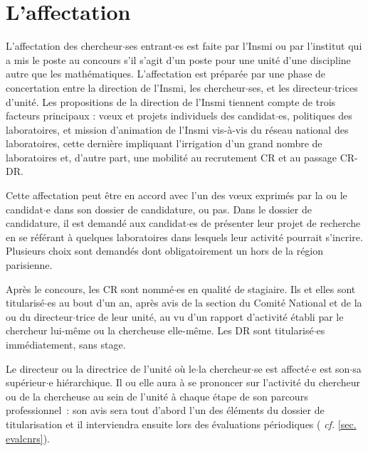 \section{L'affectation}


L'affectation des chercheur$\cdot$ses entrant$\cdot$es est faite par l'Insmi ou par l'institut qui a mis le poste au concours s'il s'agit d'un poste pour une unit\'e d'une discipline autre que les math\'ematiques. 
L'affectation est pr\' epar\' ee par une phase de concertation entre la direction de l'Insmi, les chercheur$\cdot$ses, et les directeur$\cdot$trices d'unit\' e. Les propositions de la direction de l'Insmi tiennent compte de trois facteurs principaux : v\oe ux et projets individuels des candidat$\cdot$es, politiques des laboratoires, et mission d'animation de l'Insmi vis-\`a-vis du r\' eseau national des laboratoires, cette derni\` ere impliquant l'irrigation d'un grand nombre de laboratoires et, d'autre part, une mobilit\' e au recrutement CR et au passage CR-DR.


Cette affectation peut \^etre en accord avec l'un des v\oe ux exprim\' es par la ou le candidat$\cdot$e
dans son dossier de candidature, ou pas. Dans le dossier de candidature, il est demand\'e aux candidat$\cdot$es de pr\'esenter
leur projet de recherche en se r\'ef\'erant \`a quelques laboratoires dans lesquels leur activit\'e pourrait s'incrire. Plusieurs choix sont demand\'es dont obligatoirement un hors de la r\'egion parisienne.

Apr\`es le concours, les CR sont nomm\'e$\cdot$es en qualit\'e de stagiaire.  Ils et elles sont
titularis\'e$\cdot$es au bout d'un an,  apr\`es avis de la section du Comit\'e National et de la ou du
directeur$\cdot$trice de leur unit\'e, au vu d'un rapport d'activit\'e
\'etabli par le chercheur lui-m\^eme ou la chercheuse elle-m\^eme. Les DR sont titularis\'e$\cdot$es imm\'ediatement, sans stage.

Le directeur ou la directrice de l'unit\'e o\`u le$\cdot$la chercheur$\cdot$se est affect\'e$\cdot$e est son$\cdot$sa sup\'erieur$\cdot$e hi\'erarchique. Il ou elle aura \`a se prononcer
sur l'activit\'e du chercheur ou de la chercheuse au sein de l'unit\'e \`a chaque
\'etape de son parcours professionnel~: son avis sera tout d'abord
l'un des \'el\'ements du dossier de titularisation et il
interviendra ensuite lors des \'evaluations p\'eriodiques ({{\em
cf.}} \ref{sec. evalcnrs}).

